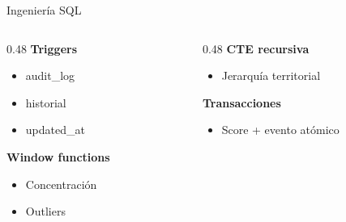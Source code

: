\documentclass[aspectratio=169,10pt]{beamer}
\begin{document}
\begin{frame}{Ingeniería SQL}
  \begin{columns}[T]
    \begin{column}{0.48\textwidth}
      \textbf{Triggers}
      \begin{itemize}
        \item audit\_log
        \item historial
        \item updated\_at
      \end{itemize}
      
      \vspace{0.3cm}
      
      \textbf{Window functions}
      \begin{itemize}
        \item Concentración
        \item Outliers
      \end{itemize}
    \end{column}
    
    \begin{column}{0.48\textwidth}
      \textbf{CTE recursiva}
      \begin{itemize}
        \item Jerarquía territorial
      \end{itemize}
      
      \vspace{0.3cm}
      
      \textbf{Transacciones}
      \begin{itemize}
        \item Score + evento atómico
      \end{itemize}
    \end{column}
  \end{columns}
\end{frame}
\end{document}
